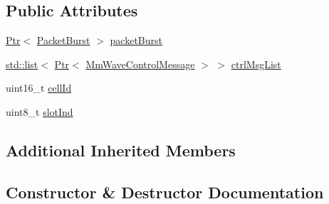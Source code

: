 \subsection*{Public Attributes}
\begin{DoxyCompactItemize}
\item 
\hyperlink{classns3_1_1Ptr}{Ptr}$<$ \hyperlink{classns3_1_1PacketBurst}{Packet\+Burst} $>$ \hyperlink{structns3_1_1MmwaveSpectrumSignalParametersDataFrame_a45f16c545d8942f39987bd7c4cfda132}{packet\+Burst}
\item 
\hyperlink{openflow-interface_8h_afd9bcfa176617760671b67580f536fa7}{std\+::list}$<$ \hyperlink{classns3_1_1Ptr}{Ptr}$<$ \hyperlink{classns3_1_1MmWaveControlMessage}{Mm\+Wave\+Control\+Message} $>$ $>$ \hyperlink{structns3_1_1MmwaveSpectrumSignalParametersDataFrame_aeb0dbbb4ab3f75e07c4a2d4c3741ec66}{ctrl\+Msg\+List}
\item 
uint16\+\_\+t \hyperlink{structns3_1_1MmwaveSpectrumSignalParametersDataFrame_a9bc1db0177fad559f6fb0c5cd27a9f01}{cell\+Id}
\item 
uint8\+\_\+t \hyperlink{structns3_1_1MmwaveSpectrumSignalParametersDataFrame_a717a7f259708ea21c958a840bd576f7b}{slot\+Ind}
\end{DoxyCompactItemize}
\subsection*{Additional Inherited Members}


\subsection{Constructor \& Destructor Documentation}
